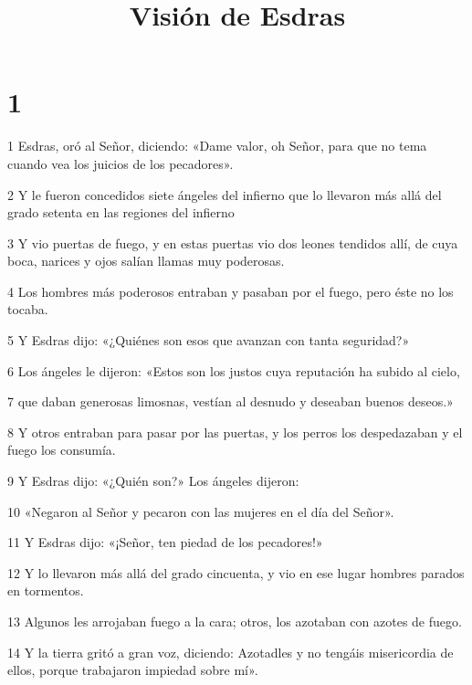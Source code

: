 

\title{Visión de Esdras}

\chapter{1}

\par 1 Esdras, oró al Señor, diciendo: «Dame valor, oh Señor, para que no tema cuando vea los juicios de los pecadores».

\par 2 Y le fueron concedidos siete ángeles del infierno que lo llevaron más allá del grado setenta en las regiones del infierno

\par 3 Y vio puertas de fuego, y en estas puertas vio dos leones tendidos allí, de cuya boca, narices y ojos salían llamas muy poderosas.

\par 4 Los hombres más poderosos entraban y pasaban por el fuego, pero éste no los tocaba. 

\par 5 Y Esdras dijo: «¿Quiénes son esos que avanzan con tanta seguridad?» 

\par 6 Los ángeles le dijeron: «Estos son los justos cuya reputación ha subido al cielo,

\par 7 que daban generosas limosnas, vestían al desnudo y deseaban buenos deseos.»

\par 8 Y otros entraban para pasar por las puertas, y los perros los despedazaban y el fuego los consumía.

\par 9 Y Esdras dijo: «¿Quién son?» Los ángeles dijeron:

\par 10 «Negaron al Señor y pecaron con las mujeres en el día del Señor».

\par 11 Y Esdras dijo: «¡Señor, ten piedad de los pecadores!»

\par 12 Y lo llevaron más allá del grado cincuenta, y vio en ese lugar hombres parados en tormentos.

\par 13 Algunos les arrojaban fuego a la cara; otros, los azotaban con azotes de fuego.

\par 14 Y la tierra gritó a gran voz, diciendo: Azotadles y no tengáis misericordia de ellos, porque trabajaron impiedad sobre mí».


